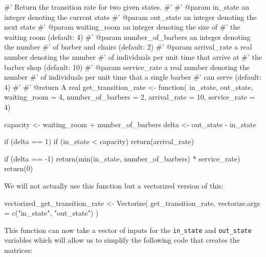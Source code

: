 \begin{Rin}
#' Return the transition rate for two given states.
#'
#' @param in_state an integer denoting the current state
#' @param out_state an integer denoting the next state
#' @param waiting_room an integer denoting the size of
#'        the waiting room (default: 4)
#' @param number_of_barbers an integer denoting the number
#'        of barber and chairs (default: 2)
#' @param arrival_rate a real number denoting the number
#'        of individuals per  unit time that arrive at
#'        the barber shop (default: 10)
#' @param service_rate a real number denoting the number
#'        of individuals per unit time that a single barber
#'        can serve (default: 4)
#'
#' @return A real
get_transition_rate <- function(
                                in_state,
                                out_state,
                                waiting_room = 4,
                                number_of_barbers = 2,
                                arrival_rate = 10,
                                service_rate = 4) {
  capacity <- waiting_room + number_of_barbers
  delta <- out_state - in_state

  if (delta == 1) {
    if (in_state < capacity) {
      return(arrival_rate)
    }
  }

  if (delta == -1) {
    return(min(in_state, number_of_barbers) * service_rate)
  }
  return(0)
}
\end{Rin}

We will not actually use this function but a vectorized version of this:

\begin{Rin}
vectorized_get_transition_rate <- Vectorize(
  get_transition_rate,
  vectorize.args = c("in_state", "out_state")
)
\end{Rin}

This function can now take a vector of inputs for the \texttt{in_state}
and \texttt{out_state} variables which will allow us to simplify the
following code that creates the matrices:

